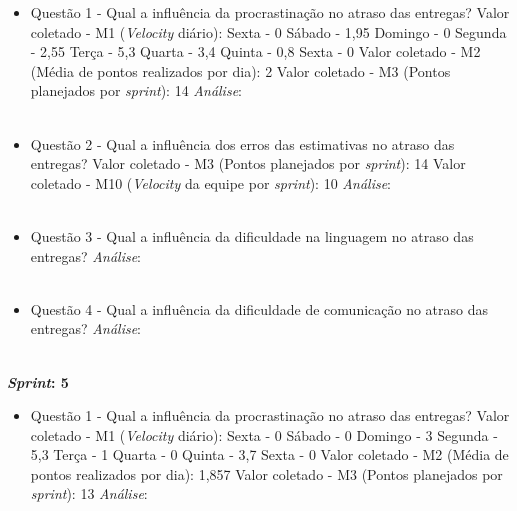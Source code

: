 \begin{apendicesenv}
\begin{itemize}
	  \item Questão 1 - Qual a influência da procrastinação no atraso das entregas?
	    \subitem Valor coletado - M1 (\textit{Velocity} diário):
	      \subsubitem Sexta - 0
	      \subsubitem Sábado - 1,95
	      \subsubitem Domingo - 0
	      \subsubitem Segunda - 2,55
	      \subsubitem Terça - 5,3
	      \subsubitem Quarta - 3,4
	      \subsubitem Quinta - 0,8
	      \subsubitem Sexta - 0
	    \subitem Valor coletado - M2 (Média de pontos realizados por dia): 2
	    \subitem Valor coletado - M3 (Pontos planejados por \textit{sprint}): 14
	    \subitem \textit{Análise}:
	    \\
	    \\

	  \item Questão 2 - Qual a influência dos erros das estimativas no atraso das entregas? 
	    \subitem Valor coletado - M3 (Pontos planejados por \textit{sprint}): 14 
	    \subitem Valor coletado - M10 (\textit{Velocity} da equipe por \textit{sprint}): 10
	    \subitem \textit{Análise}:
	    \\
	    \\
	    
	  \item Questão 3 - Qual a influência da dificuldade na linguagem no atraso das entregas?
	    \subitem \textit{Análise}:
	  \\
	  \\
	  
	  \item Questão 4 - Qual a influência da dificuldade de comunicação no atraso das entregas?
	    \subitem \textit{Análise}:
	  \\
	  \\
	  
	\end{itemize}
	    \vfill
	    \pagebreak
	\textbf{\textit{Sprint}: 5}
	
	\begin{itemize}
	  
	  \item Questão 1 - Qual a influência da procrastinação no atraso das entregas?
	    \subitem Valor coletado - M1 (\textit{Velocity} diário):
	      \subsubitem Sexta - 0
	      \subsubitem Sábado - 0 
	      \subsubitem Domingo - 3
	      \subsubitem Segunda - 5,3
	      \subsubitem Terça - 1
	      \subsubitem Quarta - 0
	      \subsubitem Quinta - 3,7
	      \subsubitem Sexta - 0
	    \subitem Valor coletado - M2 (Média de pontos realizados por dia): 1,857
	    \subitem Valor coletado - M3 (Pontos planejados por \textit{sprint}): 13
	    \subitem \textit{Análise}:
	    \\
	    \\


\end{itemize}
\end{apendicesenv}
